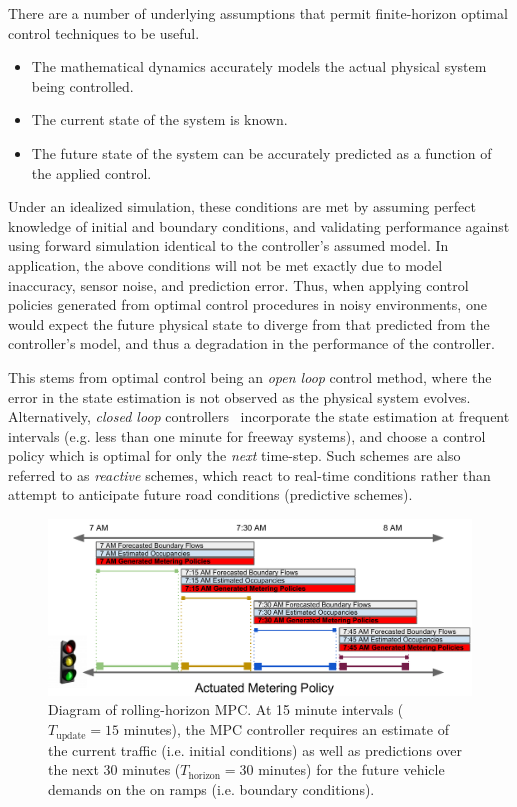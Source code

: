 There are a number of underlying assumptions that permit finite-horizon optimal control techniques to be useful.

\begin{itemize}
	\item The mathematical dynamics accurately models the actual physical system being controlled.
	\item The current state of the system is known.
	\item The future state of the system can be accurately predicted as a function of the applied control.
\end{itemize}

Under an idealized simulation, these conditions are met by assuming perfect knowledge of initial and boundary conditions, and validating performance against using forward simulation identical to the controller's assumed model. In application, the above conditions will not be met exactly due to model inaccuracy, sensor noise, and prediction error. Thus, when applying control policies generated from optimal control procedures in noisy environments, one would expect the future physical state to diverge from that predicted from the controller's model, and thus a degradation in the performance of the controller.

This stems from optimal control being an \emph{open loop} control method, where the error in the state estimation is not observed as the physical system evolves. Alternatively, \emph{closed loop} controllers~\cite{Papageorgiou1991,Papamichail} incorporate the state estimation at frequent intervals (e.g. less than one minute for freeway systems), and choose a control policy which is optimal for only the \emph{next} time-step. Such schemes are also referred to as \emph{reactive} schemes, which react to real-time conditions rather than attempt to anticipate future road conditions (predictive schemes).

\begin{figure}[htbp]
	\centering
	\includegraphics[width=\textwidth]{diagrams/mpc}
	\caption{Diagram of rolling-horizon MPC. At 15 minute intervals ($T_{\text{update}} =15$ minutes), the MPC controller requires an estimate of the current traffic (i.e. initial conditions) as well as predictions over the next 30 minutes ($T_{\text{horizon}} = 30$ minutes) for the future vehicle demands on the on ramps (i.e. boundary conditions).
	}
	\label{fig:mpc-overview}
\end{figure}

